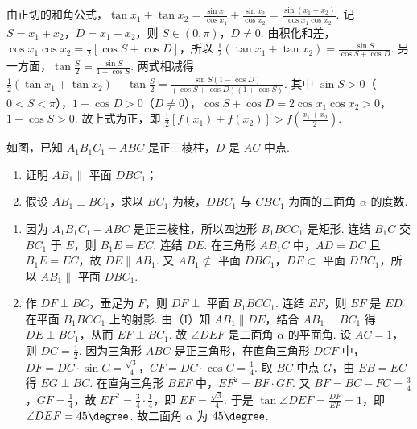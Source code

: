 \documentclass[UTF8,a4paper,oneside,11pt]{ctexbook}
\begin{document}
\begin{solution}
由正切的和角公式，\(\tan x_1 + \tan x_2 = \frac{\sin x_1}{\cos x_1} + \frac{\sin x_2}{\cos x_2} = \frac{\sin \left(x_1 + x_2\right)}{\cos x_1 \cos x_2}\). 记 \(S = x_1 + x_2\)，\(D = x_1 - x_2\)，则 \(S \in (0, \pi)\)，\(D \neq 0\). 由积化和差，\(\cos x_1 \cos x_2 = \frac{1}{2}\left[\cos S + \cos D\right]\)，所以 \(\frac{1}{2}\left(\tan x_1 + \tan x_2\right) = \frac{\sin S}{\cos S + \cos D}\). 另一方面，\(\tan \frac{S}{2} = \frac{\sin S}{1 + \cos S}\). 两式相减得 \(\frac{1}{2}\left(\tan x_1 + \tan x_2\right) - \tan \frac{S}{2} = \frac{\sin S\left(1 - \cos D\right)}{\left(\cos S + \cos D\right)\left(1 + \cos S\right)}\). 其中 \(\sin S > 0\)（\(0 < S < \pi\)），\(1 - \cos D > 0\)（\(D \neq 0\)），\(\cos S + \cos D = 2\cos x_1 \cos x_2 > 0\)，\(1 + \cos S > 0\). 故上式为正，即 \(\frac{1}{2}\left[f(x_1) + f(x_2)\right] > f\left(\frac{x_1 + x_2}{2}\right)\).
\end{solution}

\begin{problem}
如图，已知 \(A_{1}B_{1}C_{1} - ABC\) 是正三棱柱，\(D\) 是 \(AC\) 中点.

\begin{enumerate}
\item 证明 \(AB_1 \parallel\) 平面 \(DBC_1\)；
\item 假设 \(AB_1 \perp BC_1\)，求以 \(BC_1\) 为棱，\(DBC_1\) 与 \(CBC_1\) 为面的二面角 \(\alpha\) 的度数.
\end{enumerate}

\end{problem}

\begin{solution}
\begin{enumerate}
\item 因为 \(A_{1}B_{1}C_{1} - ABC\) 是正三棱柱，所以四边形 \(B_1BCC_1\) 是矩形. 连结 \(B_1C\) 交 \(BC_1\) 于 \(E\)，则 \(B_1E = EC\). 连结 \(DE\). 在三角形 \(AB_1C\) 中，\(AD = DC\) 且 \(B_1E = EC\)，故 \(DE \parallel AB_1\). 又 \(AB_1 \not\subset\) 平面 \(DBC_1\)，\(DE \subset\) 平面 \(DBC_1\)，所以 \(AB_1 \parallel\) 平面 \(DBC_1\).
\item 作 \(DF \perp BC\)，垂足为 \(F\)，则 \(DF \perp\) 平面 \(B_1BCC_1\). 连结 \(EF\)，则 \(EF\) 是 \(ED\) 在平面 \(B_1BCC_1\) 上的射影. 由（I）知 \(AB_1 \parallel DE\)，结合 \(AB_1 \perp BC_1\) 得 \(DE \perp BC_1\)，从而 \(EF \perp BC_1\). 故 \(\angle DEF\) 是二面角 \(\alpha\) 的平面角. 设 \(AC = 1\)，则 \(DC = \frac{1}{2}\). 因为三角形 \(ABC\) 是正三角形，在直角三角形 \(DCF\) 中，\(DF = DC \cdot \sin C = \frac{\sqrt{3}}{4}\)，\(CF = DC \cdot \cos C = \frac{1}{4}\). 取 \(BC\) 中点 \(G\)，由 \(EB = EC\) 得 \(EG \perp BC\). 在直角三角形 \(BEF\) 中，\(EF^2 = BF \cdot GF\). 又 \(BF = BC - FC = \frac{3}{4}\)，\(GF = \frac{1}{4}\)，故 \(EF^2 = \frac{3}{4} \cdot \frac{1}{4}\)，即 \(EF = \frac{\sqrt{3}}{4}\). 于是 \(\tan \angle DEF = \frac{DF}{EF} = 1\)，即 \(\angle DEF = 45\degree\). 故二面角 \(\alpha\) 为 \(45\degree\).
\end{enumerate}
\end{solution}
\end{document}
